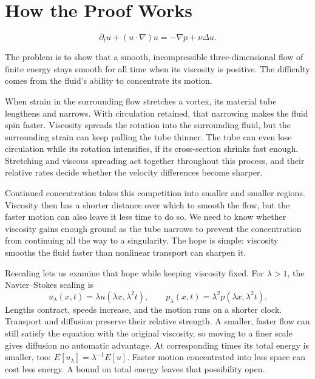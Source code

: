 \begingroup
\setlength{\parindent}{0pt}
\setlength{\parskip}{0.45\baselineskip}
\setlength{\abovedisplayskip}{7pt plus 1pt minus 1pt}
\setlength{\belowdisplayskip}{7pt plus 1pt minus 1pt}
\setlength{\jot}{5pt}
\section*{How the Proof Works}
\[
 \partial_tu+(u\cdot\nabla)u=-\nabla p+\nu\Delta u.
\]

The problem is to show that a smooth, incompressible three-dimensional flow
of finite energy stays smooth for all time when its viscosity is positive.
The difficulty comes from the fluid's ability to concentrate its motion.

When strain in the surrounding flow stretches a vortex, its material tube
lengthens and narrows. With circulation retained, that narrowing makes the
fluid spin faster. Viscosity spreads the rotation into the surrounding fluid,
but the surrounding strain can keep pulling the tube thinner. The tube can
even lose circulation while its rotation intensifies, if its cross-section
shrinks fast enough. Stretching and viscous spreading act together throughout
this process, and their relative rates decide whether the velocity differences
become sharper.

Continued concentration takes this competition into smaller and smaller
regions. Viscosity then has a shorter distance over which to smooth the flow,
but the faster motion can also leave it less time to do so. We need to know
whether viscosity gains enough ground as the tube narrows to prevent the
concentration from continuing all the way to a singularity.
The hope is simple: viscosity smooths the fluid faster than nonlinear
transport can sharpen it.

Rescaling lets us examine that hope while keeping viscosity fixed. For
\(\lambda>1\), the Navier--Stokes scaling is
\[
 u_\lambda(x,t)=\lambda u(\lambda x,\lambda^2t),
 \qquad p_\lambda(x,t)=\lambda^2p(\lambda x,\lambda^2t).
\]
Lengths contract, speeds increase, and the motion runs on a shorter clock.
Transport and diffusion preserve their relative strength. A smaller, faster
flow can still satisfy the equation with the original viscosity, so moving
to a finer scale gives diffusion no automatic advantage. At corresponding
times its total energy is smaller, too:
\(E[u_\lambda]=\lambda^{-1}E[u]\). Faster motion concentrated into less
space can cost less energy. A bound on total energy leaves that possibility
open.


